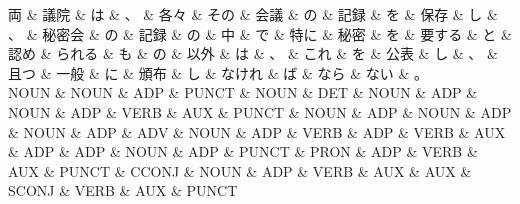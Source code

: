 \documentclass[tikz,border=5pt]{standalone}
\begin{document}
\small
\begin{dependency}[edge unit distance=10.9pt]
    \begin{deptext}[column sep=0.5em]
        両 \& 議院 \& は \& 、 \& 各々 \& その \& 会議 \& の \& 記録 \& を \& 保存 \& し \& 、 \& 秘密会 \& の \& 記録 \& の \& 中 \& で \& 特に \& 秘密 \& を \& 要する \& と \& 認め \& られる \& も \& の \& 以外 \& は \& 、 \& これ \& を \& 公表 \& し \& 、 \& 且つ \& 一般 \& に \& 頒布 \& し \& なけれ \& ば \& なら \& ない \& 。\\
        NOUN \& NOUN \& ADP \& PUNCT \& NOUN \& DET \& NOUN \& ADP \& NOUN \& ADP \& VERB \& AUX \& PUNCT \& NOUN \& ADP \& NOUN \& ADP \& NOUN \& ADP \& ADV \& NOUN \& ADP \& VERB \& ADP \& VERB \& AUX \& ADP \& ADP \& NOUN \& ADP \& PUNCT \& PRON \& ADP \& VERB \& AUX \& PUNCT \& CCONJ \& NOUN \& ADP \& VERB \& AUX \& AUX \& SCONJ \& VERB \& AUX \& PUNCT\\
    \end{deptext}
\end{dependency}
\end{document}
